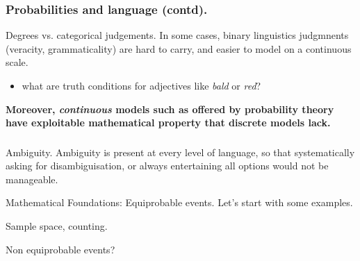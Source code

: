 \documentclass{beamer}
\begin{document}
\begin{frame}
  \frametitle{Probabilities and language (contd).}
  
  \begin{block}{Degrees vs. categorical judgements.}
    In some cases, binary linguistics judgmnents (veracity, grammaticality) are hard to carry, and easier to model on a continuous scale.
    \begin{itemize}
    \item what are truth conditions for adjectives like \emph{bald} or \emph{red}?
    \end{itemize}
    {\bf Moreover, \emph{continuous} models such as offered by probability theory have exploitable mathematical property that discrete models lack.}
  \end{block}
\end{frame}

\begin{frame}
  \frametitle{}
  \begin{block}{Ambiguity.}
    Ambiguity is present at every level of language, so that systematically asking for disambiguisation, or always entertaining all options would not be manageable.
  \end{block}
\end{frame}

\begin{frame}{Mathematical Foundations: Equiprobable events.}
  Let's start with some examples.
\end{frame}

\begin{frame}{Sample space, counting.}
\end{frame}

\begin{frame}{Non equiprobable events?}

\end{frame}
\end{document}

